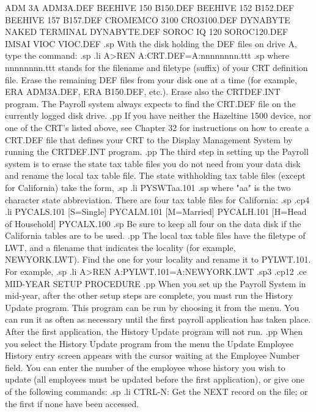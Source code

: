     ADM 3A			     ADM3A.DEF
    BEEHIVE 150 		     B150.DEF
    BEEHIVE 152 		     B152.DEF
    BEEHIVE 157 		     B157.DEF
    CROMEMCO 3100		     CRO3100.DEF
    DYNABYTE NAKED TERMINAL	     DYNABYTE.DEF
    SOROC IQ 120		     SOROC120.DEF
    IMSAI VIOC			     VIOC.DEF
.sp
With the disk holding the DEF files on drive A, type the command:
.sp
.li
		A>REN A:CRT.DEF=A:nnnnnnnn.ttt
.sp
where nnnnnnnn.ttt stands for the filename and filetype (suffix)
of your CRT definition file.  Erase the remaining DEF files from
your disk one at a time (for example, ERA ADM3A.DEF, ERA B150.DEF, etc.).
Erase also the CRTDEF.INT program.
The Payroll system always expects to find the CRT.DEF file on
the currently logged disk drive.
.pp
If you have neither the Hazeltine 1500 device, nor one of
the CRT's listed above, see Chapter 32 for instructions on how to
create a CRT.DEF file that defines
your CRT to the Display Management System by running the
CRTDEF.INT program.
.pp
The third step in setting up the Payroll system is to erase the state
tax table files you do not need from your data disk and rename the local
tax table file.
The state
withholding tax table files (except for California) take the form,
.sp
.li
		PYSWTaa.101
.sp
where "aa" is the two character state abbreviation.  There are four
tax table files for California:
.sp
.cp4
.li
	PYCALS.101	     [S=Single]
	PYCALM.101	     [M=Married]
	PYCALH.101	     [H=Head of Household]
	PYCALX.100
.sp
Be sure to keep all four on the data disk if the California tables
are to be used.
.pp
The local tax table files have the filetype of LWT, and a filename that
indicates the locality (for example, NEWYORK.LWT).  Find the one for your
locality and rename it to PYLWT.101.  For example,
.sp
.li
		A>REN A:PYLWT.101=A:NEWYORK.LWT
.sp3
.cp12
.ce
MID-YEAR SETUP PROCEDURE
.pp
When you set up the Payroll System in mid-year, after the other setup
steps are complete, you must run the History Update program.  This
program can be run by choosing it from the menu.  You can run it
as often as necessary until the first payroll application has taken
place.	After the first application, the History Update program will
not run.
.pp
When you select the History Update program from the menu the Update
Employee History entry screen appears with the cursor waiting at
the Employee Number field.  You can enter the number of the employee
whose history you wish to update (all employees must be updated before
the first application), or give one of the following commands:
.sp
.li
	  CTRL-N: Get the NEXT record on the file;  or
		  the first if none have been accessed.
